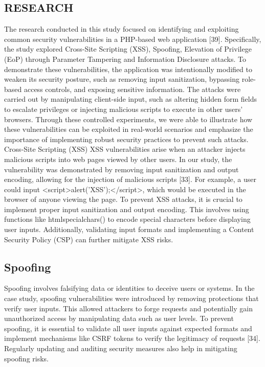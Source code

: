 \documentclass[letterpaper,twocolumn]{article}
\begin{document}
\subsection{RESEARCH}
The research conducted in this study focused on identifying and exploiting common security vulnerabilities in a PHP-based web application [39]. Specifically, the study explored Cross-Site Scripting (XSS), Spoofing, Elevation of Privilege (EoP) through Parameter Tampering and Information Disclosure attacks. To demonstrate these vulnerabilities, the application was intentionally modified to weaken its security posture, such as removing input sanitization, bypassing role-based access controls, and exposing sensitive information. The attacks were carried out by manipulating client-side input, such as altering hidden form fields to escalate privileges or injecting malicious scripts to execute in other users' browsers. Through these controlled experiments, we were able to illustrate how these vulnerabilities can be exploited in real-world scenarios and emphasize the importance of implementing robust security practices to prevent such attacks.
Cross-Site Scripting (XSS)
XSS vulnerabilities arise when an attacker injects malicious scripts into web pages viewed by other users. In our study, the vulnerability was demonstrated by removing input sanitization and output encoding, allowing for the injection of malicious scripts [33]. For example, a user could input <script>alert('XSS');</script>, which would be executed in the browser of anyone viewing the page. To prevent XSS attacks, it is crucial to implement proper input sanitization and output encoding. This involves using functions like htmlspecialchars() to encode special characters before displaying user inputs. Additionally, validating input formats and implementing a Content Security Policy (CSP) can further mitigate XSS risks.

\subsection{Spoofing}
Spoofing involves falsifying data or identities to deceive users or systems. In the case study, spoofing vulnerabilities were introduced by removing protections that verify user inputs. This allowed attackers to forge requests and potentially gain unauthorized access by manipulating data such as user levels. To prevent spoofing, it is essential to validate all user inputs against expected formats and implement mechanisms like CSRF tokens to verify the legitimacy of requests [34]. Regularly updating and auditing security measures also help in mitigating spoofing risks.
\end{document}
